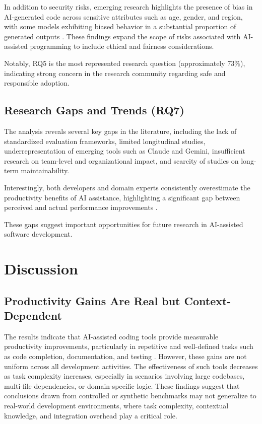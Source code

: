 \documentclass[conference]{IEEEtran}
\begin{document}
In addition to security risks, emerging research highlights the presence of bias in AI-generated code across sensitive attributes such as age, gender, and region, with some models exhibiting biased behavior in a substantial proportion of generated outputs \cite{huang2025bias}. These findings expand the scope of risks associated with AI-assisted programming to include ethical and fairness considerations.

Notably, RQ5 is the most represented research question (approximately 73\%), indicating strong concern in the research community regarding safe and responsible adoption.

\subsection{Research Gaps and Trends (RQ7)}

The analysis reveals several key gaps in the literature, including the lack of standardized evaluation frameworks, limited longitudinal studies, underrepresentation of emerging tools such as Claude and Gemini, insufficient research on team-level and organizational impact, and scarcity of studies on long-term maintainability.

Interestingly, both developers and domain experts consistently overestimate the productivity benefits of AI assistance, highlighting a significant gap between perceived and actual performance improvements \cite{becker2025impact}.

These gaps suggest important opportunities for future research in AI-assisted software development.

\section{Discussion}

\subsection{Productivity Gains Are Real but Context-Dependent}

The results indicate that AI-assisted coding tools provide measurable productivity improvements, particularly in repetitive and well-defined tasks such as code completion, documentation, and testing \cite{peng2023productivity}. However, these gains are not uniform across all development activities. The effectiveness of such tools decreases as task complexity increases, especially in scenarios involving large codebases, multi-file dependencies, or domain-specific logic. These findings suggest that conclusions drawn from controlled or synthetic benchmarks may not generalize to real-world development environments, where task complexity, contextual knowledge, and integration overhead play a critical role.
\end{document}
